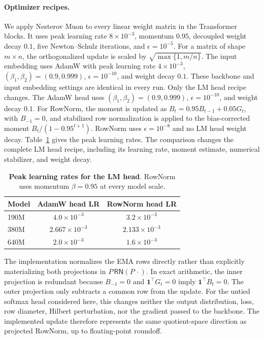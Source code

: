 \documentclass[anon]{opt2026} %
\newcommand{\one}{\mathbf{1}}
\begin{document}
\paragraph{Optimizer recipes.}
We apply Nesterov Muon to every linear weight matrix in the Transformer
blocks. It uses peak learning rate $8\times10^{-3}$, momentum $0.95$,
decoupled weight decay $0.1$, five Newton--Schulz iterations, and
$\epsilon=10^{-5}$. For a matrix of shape $m\times n$, the orthogonalized
update is scaled by $\sqrt{\max\{1,m/n\}}$. The input embedding uses AdamW
with peak learning rate $4\times10^{-3}$,
$(\beta_1,\beta_2)=(0.9,0.999)$, $\epsilon=10^{-10}$, and weight decay $0.1$.
These backbone and input embedding settings are identical in every run. Only the LM head recipe changes. The AdamW head uses
$(\beta_1,\beta_2)=(0.9,0.999)$, $\epsilon=10^{-10}$, and weight decay $0.1$. For RowNorm, the moment is updated as
$B_t=0.95B_{t-1}+0.05G_t$, with $B_{-1}=0$, and stabilized row normalization
is applied to the bias-corrected moment $B_t/(1-0.95^{t+1})$. RowNorm uses
$\epsilon=10^{-8}$ and no LM head weight decay. Table~\ref{tab:experiment-head-optimizers} gives the peak learning rates.
The comparison changes the complete LM head recipe, including its
learning rate, moment estimate, numerical stabilizer, and weight decay.


\begin{table}[t]
\centering
\small
\begin{tabular}{lcc}
\toprule
Model & AdamW head LR & RowNorm head LR \\
\midrule
190M & $4.0\times10^{-3}$   & $3.2\times10^{-3}$ \\
380M & $2.667\times10^{-3}$ & $2.133\times10^{-3}$ \\
640M & $2.0\times10^{-3}$   & $1.6\times10^{-3}$ \\
\bottomrule
\end{tabular}
\caption{\textbf{Peak learning rates for the LM head}. RowNorm uses momentum
$\beta=0.95$ at every model scale.}
\label{tab:experiment-head-optimizers}
\end{table}


The implementation normalizes the EMA rows directly rather than explicitly
materializing both projections in $P\,\mathsf{RN}(P\,\cdot)$. In exact
arithmetic, the inner projection is redundant because $B_{-1}=0$ and
$\one^\top G_t=0$ imply $\one^\top B_t=0$. The outer projection only
subtracts a common row from the update. For the untied softmax head considered
here, this changes neither the output distribution, loss, row diameter,
Hilbert perturbation, nor the gradient passed to the backbone. The implemented
update therefore represents the same quotient-space direction as projected
RowNorm, up to floating-point roundoff.
\end{document}
